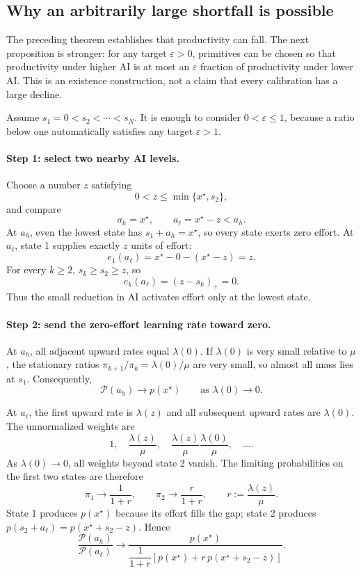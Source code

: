 \documentclass[11pt]{article}
\theoremstyle{tutorial}
\theoremstyle{remark}
\newcommand{\1}{\mathbb{I}}
\newcommand{\pos}[1]{\left(#1\right)_{+}}
\newcommand{\calP}{\mathcal{P}}
\begin{document}
\subsection{Why an arbitrarily large shortfall is possible}

The preceding theorem establishes that productivity can fall.  The next proposition is stronger: for any
target $\varepsilon>0$, primitives can be chosen so that productivity under higher AI is at most an
$\varepsilon$ fraction of productivity under lower AI.  This is an existence construction, not a claim
that every calibration has a large decline.

Assume $s_1=0<s_2<\cdots<s_N$.  It is enough to consider $0<\varepsilon\le1$, because a ratio below one
automatically satisfies any target $\varepsilon>1$.

\paragraph{Step 1: select two nearby AI levels.}
Choose a number $z$ satisfying
\[
  0<z\le\min\{x^\star,s_2\},
\]
and compare
\[
  a_h=x^\star,
  \qquad
  a_\ell=x^\star-z<a_h.
\]
At $a_h$, even the lowest state has $s_1+a_h=x^\star$, so every state exerts zero effort.  At $a_\ell$,
state 1 supplies exactly $z$ units of effort:
\[
  e_1(a_\ell)=x^\star-0-(x^\star-z)=z.
\]
For every $k\ge2$, $s_k\ge s_2\ge z$, so
\[
  e_k(a_\ell)=\pos{z-s_k}=0.
\]
Thus the small reduction in AI activates effort only at the lowest state.

\paragraph{Step 2: send the zero-effort learning rate toward zero.}
At $a_h$, all adjacent upward rates equal $\lambda(0)$.  If $\lambda(0)$ is very small relative to $\mu$,
the stationary ratios $\pi_{k+1}/\pi_k=\lambda(0)/\mu$ are very small, so almost all mass lies at $s_1$.
Consequently,
\[
  \calP(a_h)\longrightarrow p(x^\star)
  \qquad\text{as }\lambda(0)\to0.
\]

At $a_\ell$, the first upward rate is $\lambda(z)$ and all subsequent upward rates are $\lambda(0)$.
The unnormalized weights are
\[
1,\quad
\frac{\lambda(z)}{\mu},\quad
\frac{\lambda(z)}{\mu}\frac{\lambda(0)}{\mu},\quad\ldots.
\]
As $\lambda(0)\to0$, all weights beyond state 2 vanish.  The limiting probabilities on the first two states
are therefore
\[
  \pi_1\to\frac{1}{1+r},
  \qquad
  \pi_2\to\frac{r}{1+r},
  \qquad
  r:=\frac{\lambda(z)}{\mu}.
\]
State 1 produces $p(x^\star)$ because its effort fills the gap; state 2 produces
$p(s_2+a_\ell)=p(x^\star+s_2-z)$.  Hence
\begin{equation}
\frac{\calP(a_h)}{\calP(a_\ell)}
\longrightarrow
\frac{p(x^\star)}{
\dfrac{1}{1+r}\left[p(x^\star)+r\,p(x^\star+s_2-z)\right]}.
\label{eq:shortfall-limit}
\end{equation}
\end{document}
